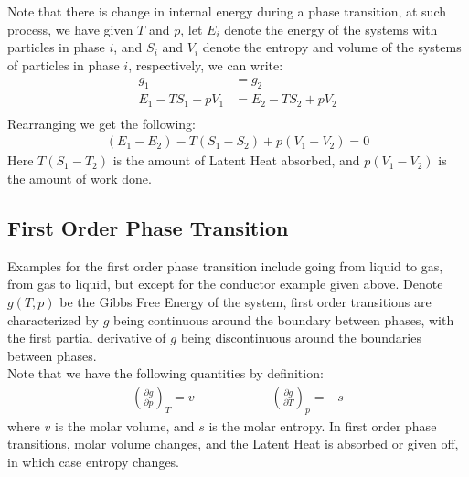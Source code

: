\documentclass[11pt,oneside]{book}
\theoremstyle{break}
\theoremstyle{break}
\newcommand{\pd}{\partial}
\newcommand{\lr}[1]{\left( #1 \right)}
\begin{document}
Note that there is change in internal energy during a phase transition, at such process, we have given $T$ and $p$, let $E_i$ denote the energy of the systems with particles in phase $i$, and $S_i$ and $V_i$ denote the entropy and volume of the systems of particles in phase $i$, respectively, we can write:
\begin{align*}
g_1 &= g_2 \\
E_1 - T S_1 + pV_1 &= E_2 - T S_2 + pV_2 \\ 
\end{align*}
Rearranging we get the following:
\begin{align*}
(E_1 - E_2) - T(S_1 - S_2) + p(V_1 - V_2) = 0
\end{align*}
Here $T(S_1 - T_2)$ is the amount of Latent Heat absorbed, and $p(V_1 - V_2)$ is the amount of work done. \\

\subsection{First Order Phase Transition}
Examples for the first order phase transition include going from liquid to gas, from gas to liquid, but except for the conductor example given above. Denote $g(T,p)$ be the Gibbs Free Energy of the system, first order transitions are characterized by $g$ being continuous around the boundary between phases, with the first partial derivative of $g$ being discontinuous around the boundaries between phases. \\

Note that we have the following quantities by definition:
\begin{align*}
\lr{\frac{\pd g}{\pd p}}_T = v \qquad\qquad\qquad \lr{\frac{\pd g}{\pd T}}_p = -s
\end{align*}
where $v$ is the molar volume, and $s$ is the molar entropy. In first order phase transitions, molar volume changes, and the Latent Heat is absorbed or given off, in which case entropy changes.\\
\end{document}
